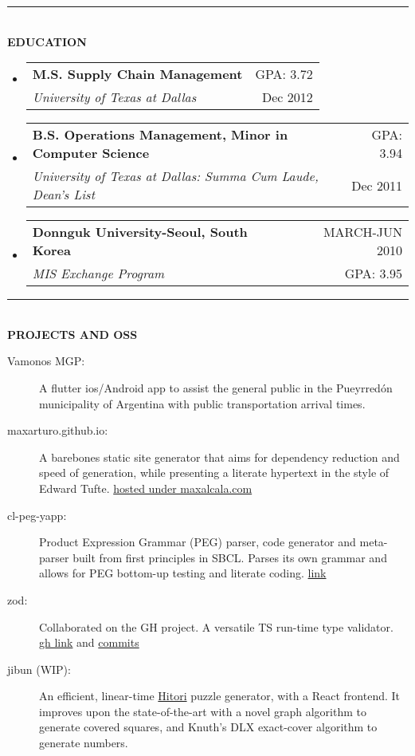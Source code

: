 \documentclass[letterpaper,11pt]{article}
\makeatletter
\newcommand{\resheading}[1]{{\large {\textbf{#1 \vphantom{p\^{E}}}}}}
\newcommand{\addline}{\noindent\rule{\textwidth}{2pt}}
\newcommand{\ressubheading}[4]{
	\begin{tabular*}{6.5in}{l@{\extracolsep{\fill}}r}
    \textbf{#1} & \MakeUppercase{#2} \\
			\textit{#3} & #4 \\
	\end{tabular*}\vspace{-6pt}}
\makeatother
\begin{document}
\addline
\\
\resheading{EDUCATION}
\begin{itemize}
\item
	\ressubheading{M.S. Supply Chain Management}{GPA: 3.72}
{University of Texas at Dallas}{Dec 2012}

\item
	\ressubheading{B.S. Operations Management, Minor in Computer Science}
		{GPA: 3.94}{University of Texas at Dallas: Summa Cum Laude, Dean's
			List}{Dec 2011}

\item
	\ressubheading{Donnguk University-Seoul, South Korea}{March-Jun 2010}{MIS
		Exchange Program}{GPA: 3.95}
\end{itemize}



\pagebreak
\addline
\\
\resheading{PROJECTS AND OSS}
\begin{description}
  \item [Vamonos MGP:] A flutter ios/Android app to assist the general public in the Pueyrredón municipality of Argentina with public transportation arrival times. 

	\item [maxarturo.github.io:] A barebones static site generator that aims for dependency reduction and speed of generation, while presenting a literate hypertext in the style of Edward Tufte. \href{https://github.com/maxArturo/maxarturo.github.io}{hosted under maxalcala.com}
	
  \item [cl-peg-yapp:] Product Expression Grammar (PEG) parser, code generator and meta-parser built from first principles in SBCL. Parses its own grammar and allows for PEG bottom-up testing and literate coding. \href{https://github.com/maxArturo/cl-peg-yapp}{link}

  \item [zod:] Collaborated on the GH project. A versatile TS run-time type validator. \href{https://github.com/colinhacks/zod}{gh link} and \href{https://github.com/colinhacks/zod/commits?author=maxArturo}{commits}

	\item [jibun (WIP):] An efficient, linear-time \href{https://en.wikipedia.org/wiki/Hitori}{Hitori} puzzle generator, with a React frontend. It improves upon the state-of-the-art with a novel graph algorithm to generate covered squares, and Knuth's DLX exact-cover algorithm to generate numbers.

\end{description}

\end{document}
